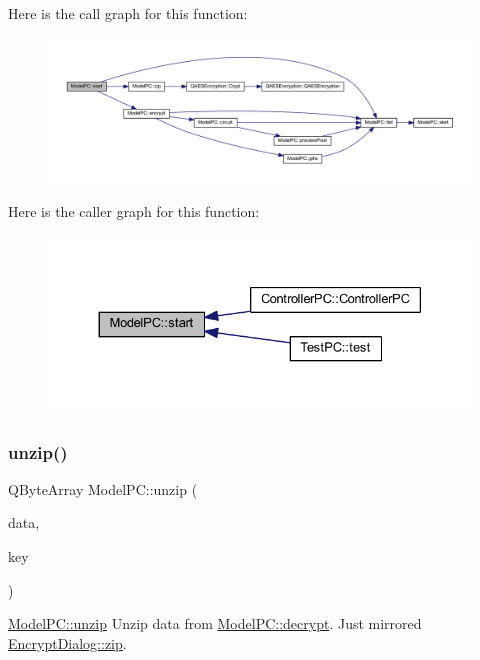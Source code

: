 Here is the call graph for this function\+:
\nopagebreak
\begin{figure}[H]
\begin{center}
\leavevmode
\includegraphics[width=350pt]{class_model_p_c_a3cae34fd5bcb06e8c1f8cfe7961bd270_cgraph}
\end{center}
\end{figure}
Here is the caller graph for this function\+:
\nopagebreak
\begin{figure}[H]
\begin{center}
\leavevmode
\includegraphics[width=330pt]{class_model_p_c_a3cae34fd5bcb06e8c1f8cfe7961bd270_icgraph}
\end{center}
\end{figure}
\mbox{\label{class_model_p_c_a6da88f166785a49f73b22c169f956fd0}} 
\subsubsection{\texorpdfstring{unzip()}{unzip()}}
{\footnotesize\ttfamily Q\+Byte\+Array Model\+P\+C\+::unzip (\begin{DoxyParamCaption}\item[{Q\+Byte\+Array}]{data,  }\item[{Q\+Byte\+Array}]{key }\end{DoxyParamCaption})}



\mbox{\hyperlink{class_model_p_c_a6da88f166785a49f73b22c169f956fd0}{Model\+P\+C\+::unzip}} Unzip data from \mbox{\hyperlink{class_model_p_c_af1f0b21565bf39808c4cdd448fad0ea8}{Model\+P\+C\+::decrypt}}. Just mirrored \mbox{\hyperlink{class_encrypt_dialog_a2bff820a3df4ddc36ecb07ed74b7138a}{Encrypt\+Dialog\+::zip}}. 


